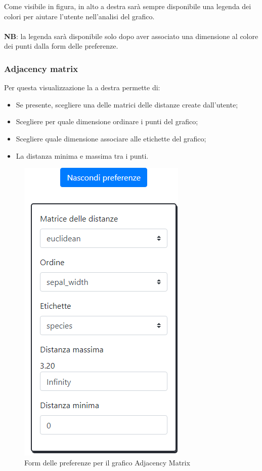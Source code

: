 Come visibile in figura, in alto a destra sarà sempre disponibile una legenda dei colori per aiutare l'utente nell'analisi del grafico.\\\mbox{}\\ \textbf{NB}: la legenda sarà disponibile solo dopo aver associato una dimensione al colore dei punti dalla form delle preferenze.

\newpage

\subsubsection{Adjacency matrix}

Per questa visualizzazione la  a destra permette di:
\begin{itemize}
	\item Se presente, scegliere una delle matrici delle distanze create dall'utente;
	\item Scegliere per quale dimensione ordinare i punti del grafico;
	\item Scegliere quale dimensione associare alle etichette del grafico;
	\item La distanza minima e massima tra i punti.
\end{itemize} 

\begin{figure}[H]
		\includegraphics[scale=0.7]{Images/amp.png}
		\centering
		\caption{Form delle preferenze per il grafico Adjacency Matrix}
\end{figure}

